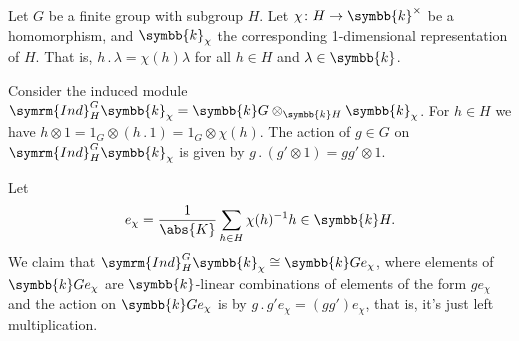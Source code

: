 \documentclass[fleqn]{NotesClass}
\renewcommand{\field}{\symbb{k}}
\newcommand{\action}{\mathbin{.}}
\newcommand{\isomorphic}{\cong}
\newcommand{\Ind}{\symrm{Ind}}
\begin{document}
    \begin{exm}{}{}
        Let \(G\) be a finite group with subgroup \(H\).
        Let \(\chi \colon H \to \field^{\times}\) be a homomorphism, and \(\field_\chi\) the corresponding 1-dimensional representation of \(H\).
        That is, \(h \action \lambda = \chi(h)\lambda\) for all \(h \in H\) and \(\lambda \in \field\).
        
        Consider the induced module \(\Ind^G_H\field_{\chi} = \field G \otimes_{\field H} \field_{\chi}\).
        For \(h \in H\) we have \(h \otimes 1 = 1_G \otimes (h \action 1) = 1_G \otimes \chi(h)\).
        The action of \(g \in G\) on \(\Ind^G_H \field_{\chi}\) is given by \(g \action (g' \otimes 1) = gg' \otimes 1\).
        
        Let
        \begin{equation}
            e_\chi = \frac{1}{\abs{K}} \sum_{h \in H} \chi(h)^{-1} h \in \field H.
        \end{equation}
        We claim that \(\Ind^G_H\field_\chi \isomorphic \field G e_\chi\), where elements of \(\field Ge_\chi\) are \(\field\)-linear combinations of elements of the form \(g e_\chi\) and the action on \(\field Ge_\chi\) is by \(g \action g'e_\chi = (gg')e_\chi\), that is, it's just left multiplication.
        

\end{exm}
\end{document}
